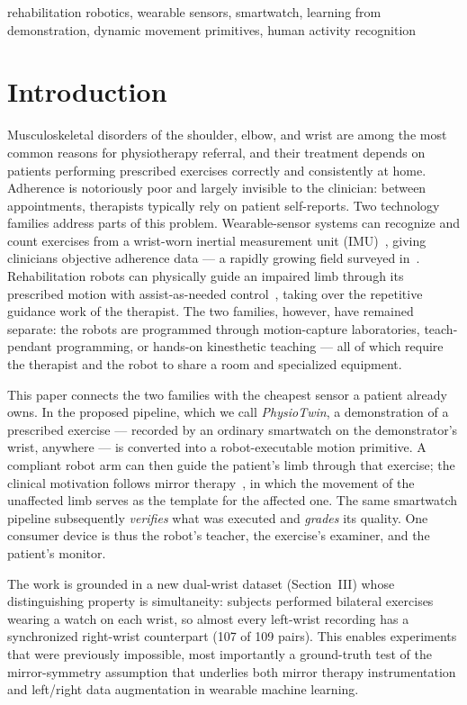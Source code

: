 \documentclass[conference]{IEEEtran}
\begin{document}
\begin{IEEEkeywords}
rehabilitation robotics, wearable sensors, smartwatch, learning from
demonstration, dynamic movement primitives, human activity recognition
\end{IEEEkeywords}

\section{Introduction}
Musculoskeletal disorders of the shoulder, elbow, and wrist are among
the most common reasons for physiotherapy referral, and their
treatment depends on patients performing prescribed exercises
correctly and consistently at home. Adherence is notoriously poor and
largely invisible to the clinician: between appointments, therapists
typically rely on patient self-reports. Two technology families
address parts of this problem. Wearable-sensor systems can recognize
and count exercises from a wrist-worn inertial measurement unit
(IMU)~\cite{burns2018}, giving clinicians objective adherence data ---
a rapidly growing field surveyed in~\cite{benachour2026review}.
Rehabilitation robots can physically guide an impaired limb through
its prescribed motion with assist-as-needed
control~\cite{krebs1998,maciejasz2014}, taking over the repetitive
guidance work of the therapist. The two families, however, have remained separate:
the robots are programmed through motion-capture laboratories,
teach-pendant programming, or hands-on kinesthetic teaching --- all of
which require the therapist and the robot to share a room and
specialized equipment.

This paper connects the two families with the cheapest sensor a
patient already owns. In the proposed pipeline, which we call
\emph{PhysioTwin}, a demonstration of a prescribed exercise ---
recorded by an ordinary smartwatch on the demonstrator's wrist,
anywhere --- is converted into a robot-executable motion primitive.
A compliant robot arm can then guide the patient's limb through that
exercise; the clinical motivation follows mirror
therapy~\cite{ramachandran1996,thieme2018}, in which the movement of
the unaffected limb serves as the template for the affected one. The
same smartwatch pipeline subsequently \emph{verifies} what was
executed and \emph{grades} its quality. One consumer device is thus
the robot's teacher, the exercise's examiner, and the patient's
monitor.

The work is grounded in a new dual-wrist dataset (Section~III) whose
distinguishing property is simultaneity: subjects performed bilateral
exercises wearing a watch on each wrist, so almost every left-wrist
recording has a synchronized right-wrist counterpart (107 of 109
pairs). This enables experiments
that were previously impossible, most importantly a ground-truth test
of the mirror-symmetry assumption that underlies both mirror therapy
instrumentation and left/right data augmentation in wearable machine
learning.
\end{document}
